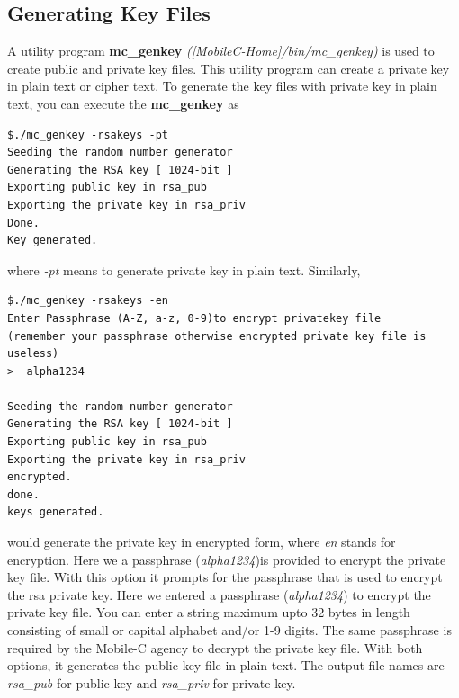 \documentclass[11pt]{report}
\begin{document}
\subsection{Generating Key Files}
A utility program {\bf mc\_genkey} \textit{([MobileC-Home]/bin/mc\_genkey)} is 
used to create public and private key files.
This utility program can create a private key in plain text or cipher text.
To generate the key files with private key in plain text, you can execute the 
{\bf mc\_genkey} as 
\begin{verbatim}
$./mc_genkey -rsakeys -pt
Seeding the random number generator 
Generating the RSA key [ 1024-bit ] 
Exporting public key in rsa_pub 
Exporting the private key in rsa_priv 
Done. 
Key generated.
\end{verbatim}
where \textit{-pt} means to generate private key in plain text. 
Similarly,
\begin{verbatim}
$./mc_genkey -rsakeys -en
Enter Passphrase (A-Z, a-z, 0-9)to encrypt privatekey file
(remember your passphrase otherwise encrypted private key file is useless)
>  alpha1234

Seeding the random number generator 
Generating the RSA key [ 1024-bit ] 
Exporting public key in rsa_pub 
Exporting the private key in rsa_priv 
encrypted. 
done. 
keys generated.
\end{verbatim}

would generate the private key in encrypted form, where \textit{en} stands 
for encryption. 
Here we a passphrase (\textit{alpha1234})is provided to encrypt the private 
  key file. 
With this option it prompts for the passphrase that is used to encrypt the 
  rsa private key. 
Here we entered a passphrase (\textit{alpha1234}) to encrypt the private 
  key file.
You can enter a string maximum upto 32 bytes in length consisting of small 
  or capital alphabet and/or 1-9 digits. 
The same passphrase is required by the Mobile-C agency to decrypt the 
  private key file.
With both options, it generates the public key file in plain text.
The output file names are \textit{rsa\_pub} for public key and
\textit{rsa\_priv} for private key.

\end{document}
